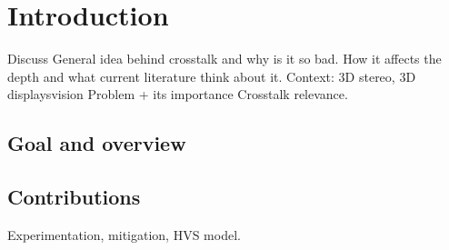 \chapter{Introduction}
\label{chap:intro}



Discuss General idea behind crosstalk and why is it so bad. How it affects the depth and what current literature think about it.
Context: 3D stereo, 3D displaysvision
Problem + its importance
Crosstalk relevance.


\section{Goal and overview}


\section{Contributions}
Experimentation, mitigation, HVS model.



